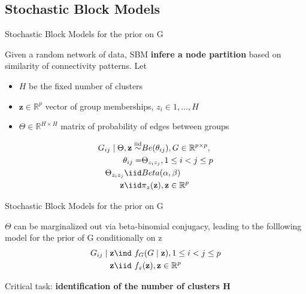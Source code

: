 
\subsection{Stochastic Block Models}
\begin{frame}{Stochastic Block Models for the prior on G}

Given a random network of data, SBM \textbf{infere a node partition} based on similarity of connectivity patterns. Let
\begin{itemize}
    \item $H$ be the fixed number of clusters
    \item $\bm{z} \in \mathbb{R}^p$ vector of group memberships, $z_{i} \in {1,\ldots,H}$
    \item $\Theta \in \mathbb{R}^{H\times H}$ matrix of probability of edges between groups
\end{itemize} 
\centering
\begin{align*}
    G_{ij} \mid \Theta,\mathbf{z} \overset{\mathrm{iid}}{\sim} & Be(\theta_{ij}),  G \in \mathbb{R}^{p \times p}, \\
    \theta_{ij} = &\Theta_{z_{i}z_{j}}, 1 \le i < j \le p \\ 
    \Theta_{z_{i}z_{j}} \iid& Beta(\alpha, \beta)\\
    \mathbf{z} \iid & \pi_{z}(\mathbf{z}), \mathbf{z} \in \mathbb{R}^p
\end{align*}

\end{frame}




\begin{frame}{Stochastic Block Models for the prior on G}

$\Theta$ can be marginalized out via beta-binomial conjugacy, leading to the folllowing model for the prior of G conditionally on z 
\centering
\begin{align*}
    G_{ij} \mid \mathbf{z} &\ind\  f_{G}(G \mid \mathbf{z}) , 1 \le i < j \le p \\ %
    \mathbf{z} &\iid\ f_{z}(\mathbf{z}), \mathbf{z} \in \mathbb{R}^p
  \end{align*}

 \large Critical task: \textbf{identification of the number of clusters H}

\end{frame}


